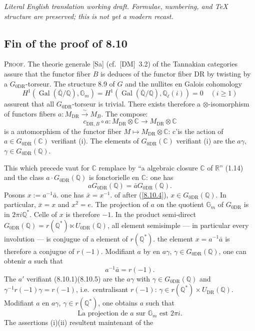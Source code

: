 \documentclass[12pt,a4paper]{article}
\theoremstyle{plain}
\theoremstyle{definition}
\theoremstyle{remark}
\DeclareMathOperator{\Gal}{Gal}
\newcommand{\Gm}{\mathbb{G}_m}
\newcommand{\Q}{\mathbb{Q}}
\newcommand{\C}{\mathbb{C}}
\newcommand{\R}{\mathbb{R}}
\newcommand{\DR}{\mathrm{DR}}
\begin{document}
\begin{center}\small\emph{Literal English translation working draft. Formulae, numbering, and TeX structure are preserved; this is not yet a modern recast.}\end{center}
\vspace{0.5em}



\subsection*{Fin of the proof of 8.10}

\textsc{Proof.} The theorie generale [Sa] (cf.~[DM]~3.2) of the Tannakian categories assure that the functor fiber $B$ is deduces of the functor fiber $\DR$ by twisting by a $G_{0\DR}$-torseur. The structure 8.9 of $G$ and the nullites en Galois cohomology
$$
H^1(\Gal(\overline{\Q}/\Q), \Gm) = H^1(\Gal(\overline{\Q}/\Q), \Q_\ell(i)) = 0 \quad (i \geq 1)
$$
assurent that all $G_{0\DR}$-torseur is trivial. There exists therefore a $\otimes$-isomorphism of functors fibers $a: M_{\DR} \xrightarrow{\sim} M_B$. The compose:
$$c_{\DR,B} \circ a : M_{\DR} \otimes \C \longrightarrow M_{\DR} \otimes \C$$
is a automorphism of the functor fiber $M \mapsto M_{\DR} \otimes \C$: c'is the action of $a \in G_{0\DR}(\C)$ verifiant (i). The elements of $G_{0\DR}(\C)$ verifiant (i) are the $a\gamma$, $\gamma \in G_{0\DR}(\Q)$.

This which precede vaut for $\C$ remplace by ``a algebraic closure $\C$ of $\R$'' (1.14) and the class $a \cdot G_{0\DR}(\Q)$ is fonctorielle en $\C$: one has
\begin{equation}\label{8.10.4}
a G_{0\DR}(\Q) = \bar{a} G_{0\DR}(\Q). \tag{8.10.4}
\end{equation}
Posons $x := a^{-1}\bar{a}$. one has $\bar{x} = x^{-1}$. of after (\ref{8.10.4}), $x \in G_{0\DR}(\Q)$. In particular, $\bar{x} = x$ and $x^2 = e$. The projection of $a$ on the quotient $\Gm$ of $G_{0\DR}$ is in $2\pi i \Q^*$. Celle of $x$ is therefore $-1$. In the product semi-direct $G_{0\DR}(\Q) = r(\Q^*) \ltimes U_{0\DR}(\Q)$, all element semisimple --- in particular every involution --- is conjugue of a element of $r(\Q^*)$. the element $x = a^{-1}\bar{a}$ is therefore a conjugue of $r(-1)$. Modifiant $a$ by en $a\gamma$, $\gamma \in G_{0\DR}(\Q)$, one can obtenir $a$ such that
\begin{equation}\label{8.10.5}
a^{-1}\bar{a} = r(-1). \tag{8.10.5}
\end{equation}
The $a'$ verifiant (8.10.1)(8.10.5) are the $a\gamma$ with $\gamma \in G_{0\DR}(\Q)$ and $\gamma^{-1}r(-1)\gamma = r(-1)$, i.e.~centralisant $r(-1)$: $\gamma \in r(\Q^*) \times U_{\DR}(\Q)$. Modifiant $a$ en $a\gamma$, $\gamma \in r(\Q^*)$, one obtains $a$ such that
\begin{equation}\label{8.10.6}
\text{La projection de $a$ sur $\Gm$ est }2\pi i. \tag{8.10.6}
\end{equation}
The assertions (i)(ii) resultent maintenant of the
\end{document}

